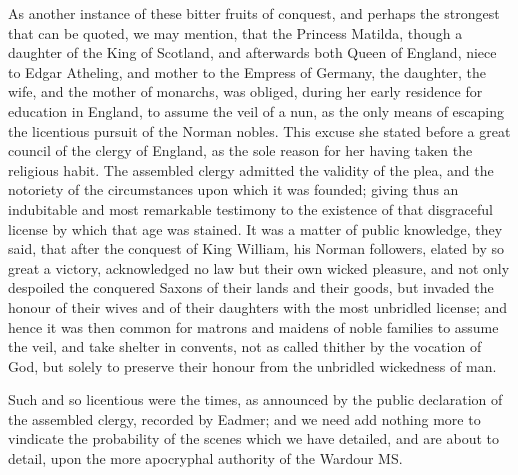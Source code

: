 As another instance of these bitter fruits of conquest, and perhaps the
strongest that can be quoted, we may mention, that the Princess Matilda,
though a daughter of the King of Scotland, and afterwards both Queen of
England, niece to Edgar Atheling, and mother to the Empress of Germany,
the daughter, the wife, and the mother of monarchs, was obliged, during
her early residence for education in England, to assume the veil of a
nun, as the only means of escaping the licentious pursuit of the Norman
nobles. This excuse she stated before a great council of the clergy of
England, as the sole reason for her having taken the religious habit.
The assembled clergy admitted the validity of the plea, and the
notoriety of the circumstances upon which it was founded; giving thus an
indubitable and most remarkable testimony to the existence of that
disgraceful license by which that age was stained. It was a matter of
public knowledge, they said, that after the conquest of King William,
his Norman followers, elated by so great a victory, acknowledged no law
but their own wicked pleasure, and not only despoiled the conquered
Saxons of their lands and their goods, but invaded the honour of their
wives and of their daughters with the most unbridled license; and hence
it was then common for matrons and maidens of noble families to assume
the veil, and take shelter in convents, not as called thither by the
vocation of God, but solely to preserve their honour from the unbridled
wickedness of man.

Such and so licentious were the times, as announced by the public
declaration of the assembled clergy, recorded by Eadmer; and we need add
nothing more to vindicate the probability of the scenes which we have
detailed, and are about to detail, upon the more apocryphal authority of
the Wardour MS.
